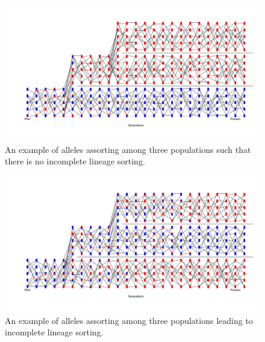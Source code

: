 \begin{figure}
\begin{center}
\includegraphics[width=\textwidth]{figures/Genetic_drift/ILS/no_ILS.pdf}
\end{center}
\caption{An example of alleles assorting among three populations such that there is no incomplete lineage sorting. } \label{fig:NoILS_poly}
\end{figure}

\begin{figure}
\begin{center}
\includegraphics[width=\textwidth]{figures/Genetic_drift/ILS/ILS.pdf}
\end{center}
\caption{An example of alleles assorting among three populations leading to incomplete lineage sorting.  } \label{fig:ILS_poly}
\end{figure}


